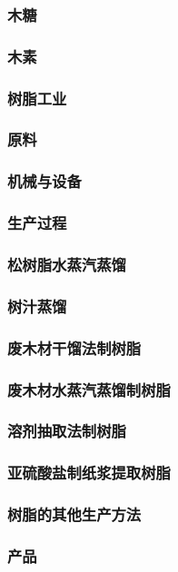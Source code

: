 \documentclass[UTF8]{../../ApplicationUniverse}
\begin{document}
            \subsubsection{木糖}
            \subsubsection{木素}
    \subsubsection{树脂工业}
        \subsubsection{原料}
        \subsubsection{机械与设备}
        \subsubsection{生产过程}
            \subsubsection{松树脂水蒸汽蒸馏}
            \subsubsection{树汁蒸馏}
            \subsubsection{废木材干馏法制树脂}
            \subsubsection{废木材水蒸汽蒸馏制树脂}
            \subsubsection{溶剂抽取法制树脂}
            \subsubsection{亚硫酸盐制纸浆提取树脂}
            \subsubsection{树脂的其他生产方法}
        \subsubsection{产品}
\end{document}
